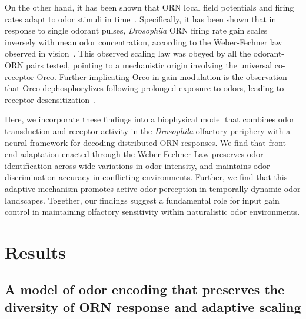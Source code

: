 On the other hand, it has been shown that ORN local field potentials and firing rates adapt to odor stimuli in time~\cite{martelli, srinivas_elife, cao_WL}. Specifically, it has been shown that in response to single odorant pulses, \textit{Drosophila}  ORN firing rate gain scales inversely with mean odor concentration, according to the Weber-Fechner law observed in vision~\cite{cao_WL, cafaro_WL, srinivas_elife}. This observed scaling law was obeyed by all the odorant-ORN pairs tested, pointing to a mechanistic origin involving the universal co-receptor Orco. Further implicating Orco in gain modulation is the observation that Orco dephosphorylizes following prolonged exposure to odors, leading to receptor desensitization~\cite{Guo_Smith_review, Guo_Smith}. 

Here, we incorporate these findings into a biophysical model that combines odor transduction and receptor activity in the \textit{Drosophila} olfactory periphery with a neural framework for decoding distributed ORN responses. We find that front-end adaptation enacted through the Weber-Fechner Law preserves odor identification across wide variations in odor intensity, and maintains odor discrimination accuracy in conflicting environments. Further, we find that this adaptive mechanism promotes active odor perception in temporally dynamic odor landscapes. Together, our findings suggest a fundamental role for input gain control in maintaining olfactory sensitivity within naturalistic odor environments. 






\section{Results}






\subsection{A model of odor encoding that preserves the diversity of ORN response and adaptive scaling}


